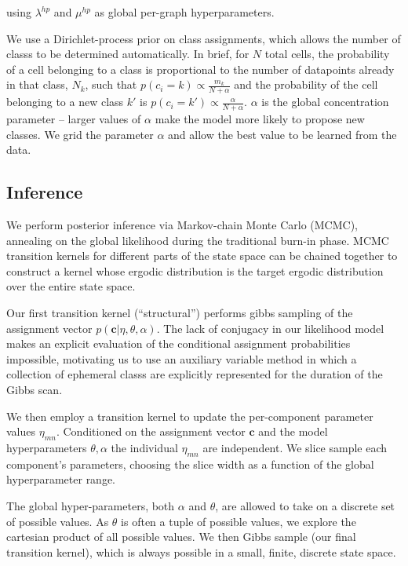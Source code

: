 \documentclass{article}
\renewcommand{\vec}[1]{\mathbf{#1}}
\begin{document}
using  $\lambda^{hp}$ and $\mu^{hp}$ as global per-graph hyperparameters. 

We use a Dirichlet-process prior on class assignments, which allows
the number of classs to be determined automatically. In brief, for $N$
total cells, the probability of a cell belonging to a class is
proportional to the number of datapoints already in that class, $N_k$,
such that $p(c_i = k) \propto \frac{m_k}{N + \alpha}$ and the
probability of the cell belonging to a new class $k'$ is $p(c_i = k')
\propto \frac{\alpha}{N + \alpha}$. $\alpha$ is the global
concentration parameter -- larger values of $\alpha$ make the model
more likely to propose new classes. We grid the parameter $\alpha$ and
allow the best value to be learned from the data.


\subsection{Inference} 
We perform posterior inference via Markov-chain Monte Carlo (MCMC),
annealing on the global likelihood during the traditional burn-in
phase. MCMC transition kernels for different parts of the state space
can be chained together to construct a kernel whose ergodic
distribution is the target ergodic distribution over the entire state space. 

Our first transition kernel (``structural'') performs gibbs sampling 
of the assignment vector $p(\vec{c} | \eta, \theta, \alpha)$. 
The lack of conjugacy in our likelihood model makes an explicit 
evaluation of the conditional assignment probabilities impossible, 
motivating us to use an auxiliary variable method \autocite{Neal2000}
in which a collection of ephemeral classs are explicitly represented
for the duration of the Gibbs scan. 

We then employ a transition kernel to update the per-component
parameter values $\eta_{mn}$. Conditioned on the assignment vector
$\vec{c}$ and the model hyperparameters $\theta, \alpha$ the 
individual $\eta_{mn}$ are independent. We slice sample \autocite{Neal2003}
each component's parameters, choosing the slice width as a function
of the global hyperparameter range. 

The global hyper-parameters, both $\alpha$ and $\theta$, are allowed
to take on a discrete set of possible values. As $\theta$ is often a
tuple of possible values, we explore the cartesian product of all
possible values. We then Gibbs sample (our final transition kernel),
which is always possible in a small, finite, discrete state space.
\end{document}
